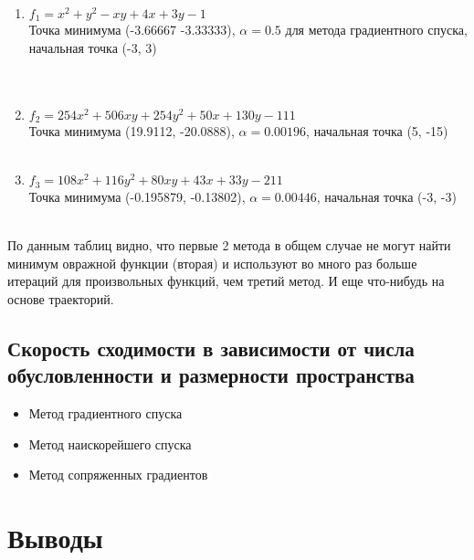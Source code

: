 	\begin{enumerate}
		\item \(f_1 = x^2 + y^2 - xy + 4x + 3y - 1\) \\
		Точка минимума (-3.66667 -3.33333), $\alpha = 0.5$ для метода градиентного спуска, начальная точка (-3, 3) \\
		\\
		\\[5mm]
		
		
		\item \(f_2 = 254x^2 + 506xy + 254y^2 + 50x + 130y - 111\) \\
		Точка минимума (19.9112, -20.0888), $\alpha = 0.00196$,
		начальная точка (5, -15)\\
		\\[5mm]
		
		\item \(f_3 = 108x^2 + 116y^2 + 80xy + 43x + 33y - 211\) \\
		Точка минимума (-0.195879, -0.13802), $\alpha = 0.00446$,
		начальная точка (-3, -3)  \\
		 \\[5mm]
		
		
	\end{enumerate}
	
	По данным таблиц видно, что первые 2 метода в общем случае не могут найти минимум овражной функции (вторая) и используют во много раз больше итераций для произвольных функций, чем третий метод.
	И еще что-нибудь на основе траекторий.
	
	\subsection{Скорость сходимости в зависимости от числа обусловленности и размерности пространства}
	
	\begin{itemize}
		\item Метод градиентного спуска
		
		\item Метод наискорейшего спуска
		
		\item Метод сопряженных градиентов
	\end{itemize}
	
	\section{Выводы}
	
